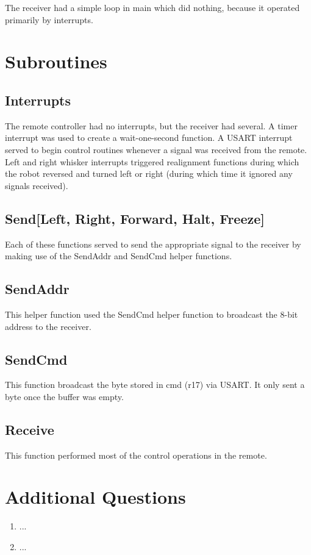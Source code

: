 \documentclass[12pt,letterpaper]{article}
\begin{document}
The receiver had a simple loop in main which did nothing, because it operated primarily by interrupts.

\section{Subroutines}
\subsection{Interrupts}
The remote controller had no interrupts, but the receiver had several. A timer interrupt was used to create a wait-one-second function. A USART interrupt served to begin control routines whenever a signal was received from the remote. Left and right whisker interrupts triggered realignment functions during which the robot reversed and turned left or right (during which time it ignored any signals received).

\subsection{Send[Left, Right, Forward, Halt, Freeze]}
Each of these functions served to send the appropriate signal to the receiver by making use of the SendAddr and SendCmd helper functions.

\subsection{SendAddr}
This helper function used the SendCmd helper function to broadcast the 8-bit address to the receiver.

\subsection{SendCmd}
This function broadcast the byte stored in cmd (r17) via USART. It only sent a byte once the buffer was empty.

\subsection{Receive}
This function performed most of the control operations in the remote.



\section{Additional Questions}
\begin{enumerate}
    \item
    ...
    
    \item
    ...

\end{enumerate}
\end{document}
